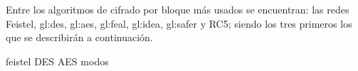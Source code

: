 
Entre los algoritmos de cifrado por bloque más usados se encuentran:
las redes Feistel, \gls{gl:des}, \gls{gl:aes}, \gls{gl:feal}, \gls{gl:idea},
\gls{gl:safer} y RC5; siendo los tres primeros los que se describirán a
continuación.

{feistel}
{DES}
{AES}
{modos}
